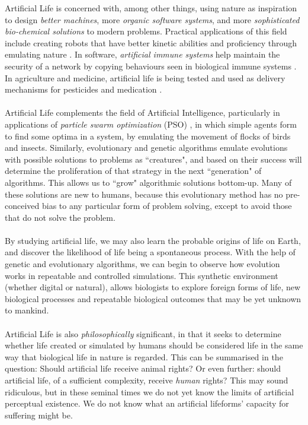 \documentclass[10pt,a4paper]{article}
\begin{document}
				Artificial Life is concerned with, among other things, using nature as
				inspiration to design \textsl{better machines}, more \textsl{organic
				software systems}, and more \textsl{sophisticated bio-chemical
				solutions} to modern problems. Practical applications of this field
				include creating robots that have better kinetic abilities and
				proficiency through emulating nature \cite{boston}. In software,
				\textsl{artificial immune systems} help maintain the security of a
				network by copying behaviours seen in biological immune systems
				\cite{immune}. In agriculture and medicine, artificial life is being
				tested and used as delivery mechanisms for pesticides and medication
				\cite{geneng}. \\\\ Artificial Life complements the field of Artificial
				Intelligence, particularly in applications of \textsl{particle swarm
				optimization} (PSO) \cite{pos}, in which simple agents form to find some
				optima in a system, by emulating the movement of flocks of birds and
				insects. Similarly, evolutionary and genetic algorithms emulate
				evolutions with possible solutions to problems as ``creatures", and
				based on their success will determine the proliferation of that strategy
				in the next ``generation" of algorithms. This allows us to ``grow"
				algorithmic solutions bottom-up. Many of these solutions are new to
				humans, because this evolutionary method has no pre-conceived bias to
				any particular form of problem solving, except to avoid those that do
				not solve the problem. \\\\ By studying artificial life, we may also
				learn the probable origins of life on Earth, and discover the likelihood
				of life being a spontaneous process. With the help of genetic and
				evolutionary algorithms, we can begin to observe how evolution works in
				repeatable and controlled simulations. This synthetic environment
				(whether digital or natural), allows biologists to explore foreign forms
				of life, new biological processes and repeatable biological outcomes
				that may be yet unknown to mankind. \\\\ Artificial Life is also
				\textsl{philosophically} significant, in that it seeks to determine
				whether life created or simulated by humans should be considered life in
				the same way that biological life in nature is regarded. This can be
				summarised in the question: Should artificial life receive animal
				rights? Or even further: should artificial life, of a sufficient
				complexity, receive \textsl{human} rights? This may sound ridiculous,
				but in these seminal times we do not yet know the limits of artificial
				perceptual existence. We do not know what an artificial lifeforms'
				capacity for suffering might be.
\end{document}
